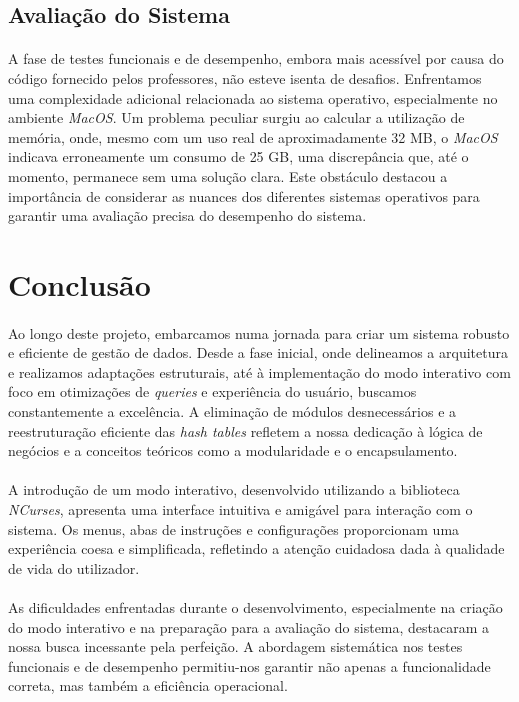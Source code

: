 \documentclass{article}
\begin{document}
\subsection{Avaliação do Sistema}
\paragraph{}A fase de testes funcionais e de desempenho, embora mais acessível por causa do código fornecido pelos professores, não esteve isenta de desafios. Enfrentamos uma complexidade adicional relacionada ao sistema operativo, especialmente no ambiente \textit{MacOS}. Um problema peculiar surgiu ao calcular a utilização de memória, onde, mesmo com um uso real de aproximadamente 32 MB, o \textit{MacOS} indicava erroneamente um consumo de 25 GB, uma discrepância que, até o momento, permanece sem uma solução clara. Este obstáculo destacou a importância de considerar as nuances dos diferentes sistemas operativos para garantir uma avaliação precisa do desempenho do sistema.
\section{Conclusão}
\paragraph{}Ao longo deste projeto, embarcamos numa jornada para criar um sistema robusto e eficiente de gestão de dados. Desde a fase inicial, onde delineamos a arquitetura e realizamos adaptações estruturais, até à implementação do modo interativo com foco em otimizações de \textit{queries} e experiência do usuário, buscamos constantemente a excelência. A eliminação de módulos desnecessários e a reestruturação eficiente das \textit{hash tables} refletem a nossa dedicação à lógica de negócios e a conceitos teóricos como a modularidade e o encapsulamento.
\vspace{-0.3cm}
\paragraph{}A introdução de um modo interativo, desenvolvido utilizando a biblioteca \textit{NCurses}, apresenta uma interface intuitiva e amigável para interação com o sistema. Os menus, abas de instruções e configurações proporcionam uma experiência coesa e simplificada, refletindo a atenção cuidadosa dada à qualidade de vida do utilizador.
\vspace{-0.3cm}
\paragraph{}As dificuldades enfrentadas durante o desenvolvimento, especialmente na criação do modo interativo e na preparação para a avaliação do sistema, destacaram a nossa busca incessante pela perfeição. A abordagem sistemática nos testes funcionais e de desempenho permitiu-nos garantir não apenas a funcionalidade correta, mas também a eficiência operacional.
\vspace{-0.3cm}
\end{document}
